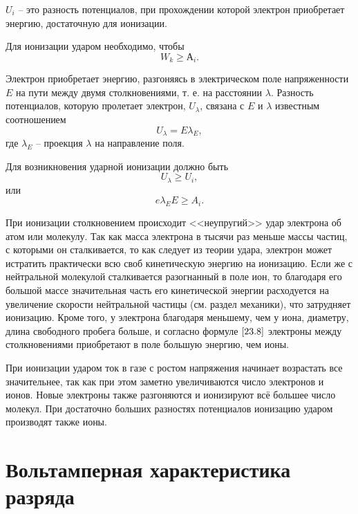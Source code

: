 \documentclass[a4paper,10pt]{book}
\begin{document}
$U_i$ -- это разность потенциалов, при прохождении которой электрон приобретает энергию, достаточную для ионизации.

Для ионизации ударом необходимо, чтобы\begin{equation}\label{23.6}
W_k \ge А_i.
\end{equation}

Электрон приобретает энергию, разгоняясь в электрическом поле напряженности $E$ на пути между двумя столкновениями, т. е. на расстоянии $\lambda$. Разность потенциалов, которую пролетает электрон, $U_{\lambda}$, связана с $E$ и $\lambda$ известным соотношением\begin{equation*}
U_{\lambda} = E \lambda_E,
\end{equation*}где $\lambda_E$ -- проекция $\lambda$ на направление поля.

Для возникновения ударной ионизации должно быть\begin{equation}\label{23.7}
U_{\lambda} \ge U_i,
\end{equation}
или
\begin{equation}\label{23.8}
e \lambda_E E \ge A_i.
\end{equation}

При ионизации столкновением происходит <<неупругий>> удар электрона об атом или молекулу. Так как масса электрона в тысячи раз меньше массы частиц, с которыми он сталкивается, то как следует из теории удара, электрон может истратить практически всю своб кинетическую энергию на ионизацию. Если же с нейтральной молекулой сталкивается разогнанный в поле ион, то благодаря его большой массе значительная часть его кинетической энергии расходуется на увеличение скорости нейтральной частицы (см. раздел механики), что затрудняет ионизацию. Кроме того, у электрона благодаря меньшему, чем у иона, диаметру, длина свободного пробега больше, и согласно формуле $\ref{23.8}$ электроны между столкновениями приобретают в поле большую энергию, чем ионы.

При ионизации ударом ток в газе с ростом напряжения начинает возрастать все значительнее, так как при этом заметно увеличиваются число электронов и ионов. Новые электроны также разгоняются и ионизируют всё большее число молекул. При достаточно больших разностях потенциалов ионизацию ударом производят также ионы.

\section{Вольтамперная характеристика разряда}
\end{document}
